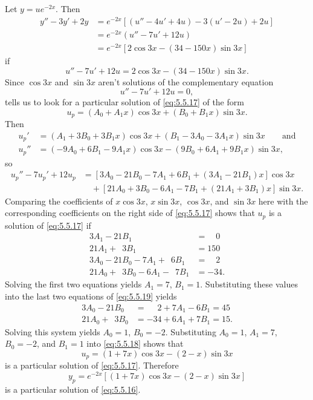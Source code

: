 \begin{solution}
Let $y=ue^{-2x}$. Then
\begin{align*}
y''-3y'+2y&=e^{-2x}\left[(u''-4u'+4u)-3(u'-2u)+2u\right]\\
&=e^{-2x}(u''-7u'+12u)\\
&=e^{-2x}\left[2\cos 3x-(34-150x)\sin 3x\right]
\end{align*}
if
\begin{equation} \label{eq:5.5.17}
u''-7u'+12u=2\cos 3x-(34-150x)\sin 3x.
\end{equation}
Since $\cos3x$ and $\sin3x$ aren't solutions of
the complementary equation
\[
u''-7u'+12u=0,
\]
 tells us to look for a particular solution
of \eqref{eq:5.5.17} of the form
\begin{equation} \label{eq:5.5.18}
u_p=(A_0+A_1x)\cos 3x +(B_0+B_1x)\sin 3x.
\end{equation}
Then
\begin{align*}
u_p'&=(A_1+3B_0+3B_1x)\cos 3x+(B_1-3A_0-3A_1x)\sin 3x\qquad\text{and}\\
u_p''&=(-9A_0+6B_1-9A_1x)\cos 3x-(9B_0+6A_1+9B_1x)\sin 3x,
\end{align*}
so
\begin{align*}
u_p''-7u_p'+12u_p
&=\left[3A_0-21B_0-7A_1+6B_1+(3A_1-21B_1)x\right]\cos3x\\
&\quad{}+\left[21A_0+3B_0-6A_1-7B_1+(21A_1+3B_1)x\right]\sin 3x.
\end{align*}
Comparing the coefficients of $x\cos 3x$, $x\sin 3x$, $\cos 3x$, and
$\sin 3x$ here with the corresponding coefficients on the right side
of \eqref{eq:5.5.17} shows that $u_p$ is a solution of \eqref{eq:5.5.17} if
\begin{equation} \label{eq:5.5.19}
\begin{aligned}
3A_1-21B_1&=\phantom{15}0\\
21A_1+\phantom{2}3B_1&=150\\
3A_0-21B_0-7A_1+\phantom{2}6B_1&=\phantom{15}2\\
21A_0+\phantom{2}3B_0-6A_1-\phantom{5}7B_1&=-34.
\end{aligned}
\end{equation}
Solving the first two equations yields $A_1=7$, $B_1=1$.
Substituting these values into the last two equations of \eqref{eq:5.5.19}
yields
\begin{align*}
3A_0-21B_0&=\phantom{-3}2+7A_1-6B_1=45\\
21A_0+\phantom{2}3B_0&=-34+6A_1+7B_1=15.
\end{align*}
Solving this system  yields  $A_0=1$, $B_0=-2$.
Substituting $A_0=1$, $A_1=7$, $B_0=-2$, and $B_1=1$ into
\eqref{eq:5.5.18} shows that
\[
u_p=(1+7x)\cos 3x-(2-x)\sin 3x
\]
is a particular solution of  \eqref{eq:5.5.17}. Therefore
\[
y_p=e^{-2x}\left[(1+7x)\cos 3x-(2-x)\sin 3x\right]
\]
is a particular solution of   \eqref{eq:5.5.16}.
\end{solution}


